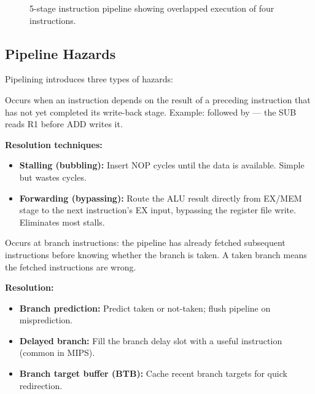 \begin{figure}[H]
\caption{5-stage instruction pipeline showing overlapped execution of four instructions.}
\label{fig:arch:pipeline}
\end{figure}

\subsection{Pipeline Hazards}

Pipelining introduces three types of hazards:

\begin{definition}
Occurs when an instruction depends on the result of a preceding instruction that has not yet completed its write-back stage. Example:  followed by  --- the SUB reads R1 before ADD writes it.
\end{definition}

\textbf{Resolution techniques:}
\begin{itemize}
  \item \textbf{Stalling (bubbling):} Insert NOP cycles until the data is available. Simple but wastes cycles.
  \item \textbf{Forwarding (bypassing):} Route the ALU result directly from EX/MEM stage to the next instruction's EX input, bypassing the register file write. Eliminates most stalls.
\end{itemize}

\begin{definition}
Occurs at branch instructions: the pipeline has already fetched subsequent instructions before knowing whether the branch is taken. A taken branch means the fetched instructions are wrong.
\end{definition}

\textbf{Resolution:}
\begin{itemize}
  \item \textbf{Branch prediction:} Predict taken or not-taken; flush pipeline on misprediction.
  \item \textbf{Delayed branch:} Fill the branch delay slot with a useful instruction (common in MIPS).
  \item \textbf{Branch target buffer (BTB):} Cache recent branch targets for quick redirection.
\end{itemize}

